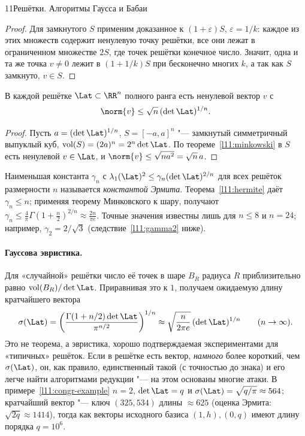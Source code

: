 \begin{lecture}{11}{Решётки. Алгоритмы Гаусса и Бабаи}
\begin{proof}
Для замкнутого $S$ применим доказанное к $(1 + \varepsilon) S$, $\varepsilon = 1/k$: каждое из
этих множеств содержит ненулевую точку решётки, все они лежат в ограниченном множестве $2S$,
где точек решётки конечное число. Значит, одна и та же точка $v \ne 0$ лежит в
$(1 + 1/k)S$ при бесконечно многих $k$, а так как $S$ замкнуто, $v \in S$.
\end{proof}

\begin{theorem}[Эрмит]\label{l11:hermite}
В каждой решётке $\Lat \subset \RR^n$ полного ранга есть ненулевой вектор $v$ с
\[
  \norm{v} \le \sqrt{n}\,(\det \Lat)^{1/n}.
\]
\end{theorem}

\begin{proof}
Пусть $a = (\det \Lat)^{1/n}$, $S = [-a, a]^n$ "--- замкнутый симметричный выпуклый куб,
$\operatorname{vol}(S) = (2a)^n = 2^n \det \Lat$. По теореме~\ref{l11:minkowski} в $S$ есть ненулевой
$v \in \Lat$, и $\norm{v} \le \sqrt{n a^2} = \sqrt n\, a$.
\end{proof}

\begin{remark}
Наименьшая константа $\gamma_n$ с $\lambda_1(\Lat)^2 \le \gamma_n (\det \Lat)^{2/n}$ для всех
решёток размерности $n$ называется \emph{константой Эрмита}. Теорема~\ref{l11:hermite} даёт
$\gamma_n \le n$; применяя теорему Минковского к шару, получают
$\gamma_n \le \frac{4}{\pi}\Gamma(1 + \frac n2)^{2/n} \approx \frac{2n}{\pi e}$. Точные значения
известны лишь для $n \le 8$ и $n = 24$; например, $\gamma_2 = 2/\sqrt3$
(следствие~\ref{l11:gamma2} ниже).
\end{remark}

\paragraph{Гауссова эвристика.} Для «случайной» решётки число её точек в шаре $B_R$ радиуса $R$
приблизительно равно $\operatorname{vol}(B_R)/\det \Lat$. Приравнивая это к $1$, получаем
ожидаемую длину кратчайшего вектора
\[
  \sigma(\Lat) = \left(\frac{\Gamma(1 + n/2)\det \Lat}{\pi^{n/2}}\right)^{1/n} \approx
  \sqrt{\frac{n}{2\pi e}}\,(\det \Lat)^{1/n} \qquad (n \to \infty).
\]
Это не теорема, а эвристика, хорошо подтверждаемая экспериментами для «типичных» решёток.
Если в решётке есть вектор, \emph{намного} более короткий, чем $\sigma(\Lat)$, он, как
правило, единственный такой (с точностью до знака) и его легче найти алгоритмами редукции
"--- на этом основаны многие атаки. В примере~\ref{l11:congr-example} $n = 2$,
$\det \Lat = q$ и $\sigma(\Lat) = \sqrt{q/\pi} \approx 564$; кратчайший вектор "--- ключ
$(325, 534)$ длины $\approx 625$ (оценка Эрмита: $\sqrt{2q} \approx 1414$), тогда как векторы
исходного базиса $(1, h), (0, q)$ имеют длину порядка $q = 10^6$.


\end{lecture}
